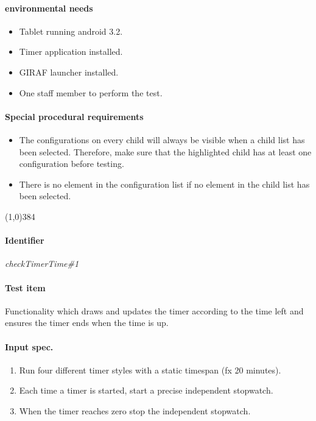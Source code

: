 \paragraph{environmental needs}
	\begin{itemize}
		\item Tablet running android 3.2.
		\item Timer application installed.
		\item GIRAF launcher installed.
		\item One staff member to perform the test.
	\end{itemize}
\paragraph{Special procedural requirements}
	\begin{itemize}
		\item The configurations on every child will always be visible when a child list has been selected. Therefore, make sure that the highlighted child has at least one configuration before testing.
		\item There is no element in the configuration list if no element in the child list has been selected.
	\end{itemize}
\begin{center}
	\line(1,0){384}
\end{center}

\pagebreak
\paragraph{Identifier}
	\textit{checkTimerTime\#1}
\paragraph{Test item}
	Functionality which draws and updates the timer according to the time left and ensures the timer ends when the time is up.
\paragraph{Input spec.}
	\begin{enumerate}
		\item Run four different timer styles with a static timespan (fx 20 minutes).
		\item Each time a timer is started, start a precise independent stopwatch.
		\item When the timer reaches zero stop the independent stopwatch.
	\end{enumerate}
